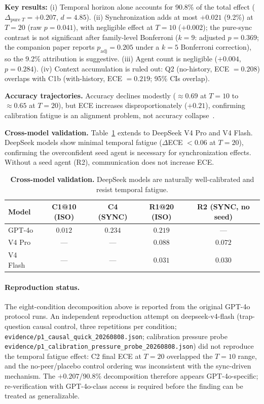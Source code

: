 \documentclass[11pt]{article}
\theoremstyle{definition}
\theoremstyle{remark}
\begin{document}
\textbf{Key results:} (i) Temporal horizon alone accounts for 90.8\% of the total effect ($\Delta_{\text{pure } T} = +0.207$, $d = 4.85$). (ii) Synchronization adds at most $+0.021$ (9.2\%) at $T{=}20$ (raw $p = 0.041$), with negligible effect at $T{=}10$ ($+0.002$); the pure-sync contrast is not significant after family-level Bonferroni ($k{=}9$: adjusted $p = 0.369$; the companion paper reports $p_{\text{adj}} = 0.205$ under a $k{=}5$ Bonferroni correction), so the 9.2\% attribution is suggestive. (iii) Agent count is negligible ($+0.004$, $p = 0.284$). (iv) Context accumulation is ruled out: Q2 (no-history, ECE $= 0.208$) overlaps with C1b (with-history, ECE $= 0.219$; 95\% CIs overlap).

\textbf{Accuracy trajectories.} Accuracy declines modestly ($\approx 0.69$ at $T{=}10$ to $\approx 0.65$ at $T{=}20$), but ECE increases disproportionately ($+0.21$), confirming calibration fatigue is an alignment problem, not accuracy collapse~\citep{he2023separating,dodge2019show}.

\textbf{Cross-model validation.} Table~\ref{tab:cross} extends to DeepSeek V4 Pro and V4 Flash. DeepSeek models show minimal temporal fatigue ($\Delta$ECE $< 0.06$ at $T{=}20$), confirming the overconfident seed agent is necessary for synchronization effects. Without a seed agent (R2), communication does not increase ECE.

\begin{table}[H]
\centering
\caption{\textbf{Cross-model validation.} DeepSeek models are naturally well-calibrated and resist temporal fatigue.}
\label{tab:cross}
\begin{tabular}{@{}lcccc@{}}
\toprule
Model & C1@10 (ISO) & C4 (SYNC) & R1@20 (ISO) & R2 (SYNC, no seed) \\
\midrule
GPT-4o & $0.012$ & $0.234$ & $0.219$ & --- \\
V4 Pro & --- & --- & $0.088$ & $0.072$ \\
V4 Flash & --- & --- & $0.031$ & $0.030$ \\
\bottomrule
\end{tabular}
\end{table}

\paragraph{Reproduction status.} The eight-condition decomposition above is reported from the original GPT-4o protocol runs. An independent reproduction attempt on deepseek-v4-flash (trap-question causal control, three repetitions per condition; \texttt{evidence/p1\_causal\_quick\_20260808.json}; calibration pressure probe \texttt{evidence/p1\_calibration\_pressure\_probe\_20260808.json}) did not reproduce the temporal fatigue effect: C2 final ECE at $T{=}20$ overlapped the $T{=}10$ range, and the no-peer/placebo control ordering was inconsistent with the sync-driven mechanism. The $+0.207$/90.8\% decomposition therefore appears GPT-4o-specific; re-verification with GPT-4o-class access is required before the finding can be treated as generalizable.
\end{document}
